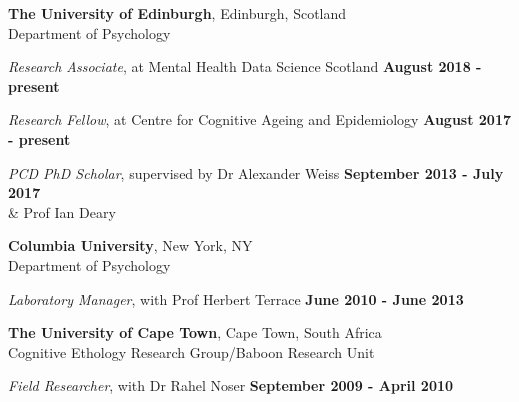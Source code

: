 \documentclass[margin,line]{res}
\begin{document}
\begin{resume}
{\bf The University of Edinburgh}, Edinburgh, Scotland \\
Department of Psychology

\vspace{-.2cm}
{\em Research Associate}, at Mental Health Data Science Scotland \hfill {\bf August 2018 - present}\\
\vspace{-.1cm}

\vspace{-.2cm}
{\em Research Fellow}, at Centre for Cognitive Ageing and Epidemiology \hfill {\bf August 2017 - present}\\
\vspace{-.1cm}


\vspace{-.2cm}
{\em PCD PhD Scholar}, supervised by Dr Alexander Weiss \hfill {\bf September 2013 - July 2017}\\
\-\hspace{4.75cm} \& Prof Ian Deary
\vspace{-.1cm}


{\bf Columbia University}, New York, NY \\
Department of Psychology

\vspace{-.2cm}
{\em Laboratory Manager}, with Prof Herbert  Terrace \hfill {\bf June 2010 - June 2013}\\
\vspace{-.3cm}


\vspace{-.1cm}

{\bf The University of Cape Town}, Cape Town, South Africa \\
Cognitive Ethology Research Group/Baboon Research Unit

\vspace{-.2cm}
{\em Field Researcher}, with Dr Rahel Noser \hfill {\bf September 2009 - April 2010}\\
\vspace{-.3cm}



\end{resume}
\end{document}
